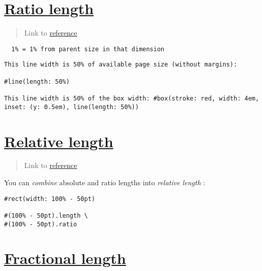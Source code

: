 \section{\texorpdfstring{\hyperref[ratio-length]{Ratio
length}}{Ratio length}}\label{ratio-length}

\begin{quote}
Link to \href{https://typst.app/docs/reference/layout/ratio/}{reference}
\end{quote}

\texttt{\ }{\texttt{\ 1\%\ =\ 1\%\ from\ parent\ size\ in\ that\ dimension\ }}\texttt{\ }

\begin{verbatim}
This line width is 50% of available page size (without margins):

#line(length: 50%)

This line width is 50% of the box width: #box(stroke: red, width: 4em, inset: (y: 0.5em), line(length: 50%))
\end{verbatim}

\pandocbounded{}

\section{\texorpdfstring{\hyperref[relative-length]{Relative
length}}{Relative length}}\label{relative-length}

\begin{quote}
Link to
\href{https://typst.app/docs/reference/layout/relative/}{reference}
\end{quote}

You can \emph{combine} absolute and ratio lengths into \emph{relative
length} :

\begin{verbatim}
#rect(width: 100% - 50pt)

#(100% - 50pt).length \
#(100% - 50pt).ratio
\end{verbatim}

\pandocbounded{}

\section{\texorpdfstring{\hyperref[fractional-length]{Fractional
length}}{Fractional length}}\label{fractional-length}

